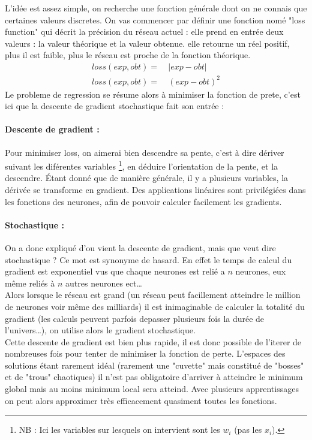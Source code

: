 L'idée est assez simple, on recherche une fonction générale dont on ne connais que certaines valeurs discretes.
On vas commencer par définir une fonction nomé "loss function"
qui décrit la précision du réseau actuel :
elle prend en entrée deux valeurs : la valeur théorique et la valeur obtenue.
elle retourne un réel positif, plus il est faible, plus le réseau est proche de la fonction théorique.
\exemle
{
\begin{align*}
    loss(exp, obt) = &\ |exp - obt| \\
    loss(exp, obt) = &\ (exp - obt)^2
\end{align*}
}
Le probleme de regression se résume alors à minimiser la fonction de prete,
c'est ici que la descente de gradient stochastique fait son entrée :


\paragraph{Descente de gradient :}
Pour minimiser loss, on aimerai bien descendre sa pente, c'est à dire dériver suivant les diférentes variables
\footnote{\textsc{NB :} Ici les variables sur lesquels on intervient sont les $w_i$ (pas les $x_i$).},
en déduire l'orientation de la pente, et la descendre.
Étant donné que de manière générale, il y a plusieurs variables, la dérivée se transforme en gradient.
Des applications linéaires sont privilégiées dans les fonctions des neurones,
afin de pouvoir calculer facilement les gradients.\\


\paragraph{Stochastique :}
On a donc expliqué d'ou vient la descente de gradient, mais que veut dire stochastique ?
Ce mot est synonyme de hasard.
En effet le temps de calcul du gradient est exponentiel vus que chaque neurones est relié a $n$ neurones,
eux même reliés à $n$ autres neurones ect\ldots\\
Alors lorsque le réseau est grand
(un réseau peut facillement atteindre le million de neurones voir même des milliards\cite{i3espectrum})
il est inimaginable de calculer la totalité du gradient (les calculs peuvent parfois depasser
plusieurs fois la durée de l'univers\ldots),
on utilise alors le gradient stochastique.\\


Cette descente de gradient est bien plus rapide, il est donc possible de l'iterer de nombreuses fois
pour tenter de minimiser la fonction de perte.
L'espaces des solutions étant rarement idéal
(rarement une "cuvette" mais constitué de "bosses" et de "trous" chaotiques)
il n'est pas obligatoire d'arriver à atteindre le minimum global mais au moins minimum local sera atteind.
Avec plusieurs apprentissages on peut alors approximer très efficacement quasiment toutes les fonctions.
